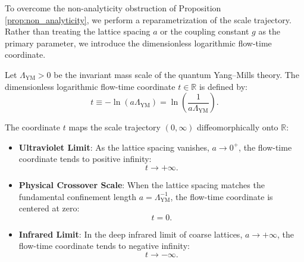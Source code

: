 To overcome the non-analyticity obstruction of Proposition \ref{prop:non_analyticity}, we perform a reparametrization of the scale trajectory. Rather than treating the lattice spacing $a$ or the coupling constant $g$ as the primary parameter, we introduce the dimensionless logarithmic flow-time coordinate.

\begin{definition}
\label{def:flow_time}
Let $\Lambda_{\mathrm{YM}} > 0$ be the invariant mass scale of the quantum Yang--Mills theory. The dimensionless logarithmic flow-time coordinate $t \in \mathbb{R}$ is defined by:
\begin{equation}
\label{eq:flow_time_def}
t \equiv -\ln(a \Lambda_{\mathrm{YM}}) = \ln\left( \frac{1}{a \Lambda_{\mathrm{YM}}} \right).
\end{equation}
\end{definition}

The coordinate $t$ maps the scale trajectory $(0, \infty)$ diffeomorphically onto $\mathbb{R}$:
\begin{itemize}
    \item \textbf{Ultraviolet Limit}: As the lattice spacing vanishes, $a \to 0^+$, the flow-time coordinate tends to positive infinity:
    \begin{equation}
    t \to +\infty.
    \end{equation}
    \item \textbf{Physical Crossover Scale}: When the lattice spacing matches the fundamental confinement length $a = \Lambda_{\mathrm{YM}}^{-1}$, the flow-time coordinate is centered at zero:
    \begin{equation}
    t = 0.
    \end{equation}
    \item \textbf{Infrared Limit}: In the deep infrared limit of coarse lattices, $a \to +\infty$, the flow-time coordinate tends to negative infinity:
    \begin{equation}
    t \to -\infty.
    \end{equation}
\end{itemize}

